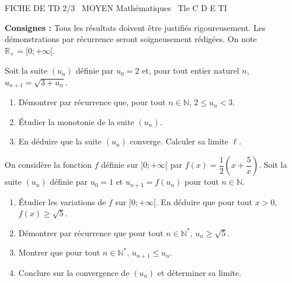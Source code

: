 \documentclass[11pt]{article}
\begin{document}
\begin{tcolorbox}[enhanced,colback=popink,colframe=popink,arc=10pt,boxrule=0pt,left=12pt,right=12pt,top=9pt,bottom=9pt]
{\color{white}\popxbold\small FICHE DE TD 2/3 \textbullet\ MOYEN \hfill Mathématiques \textbullet\ Tle C D E TI\par}
\end{tcolorbox}
\vspace{4pt}
\noindent\textbf{Consignes :} Tous les résultats doivent être justifiés rigoureusement. Les démonstrations par récurrence seront soigneusement rédigées. On note $\mathbb{R}_+ = [0; +\infty[$.

\begin{exercice}
Soit la suite $(u_n)$ définie par $u_0 = 2$ et, pour tout entier naturel $n$, $u_{n+1} = \sqrt{3 + u_n}$.
\begin{enumerate}
    \item Démontrer par récurrence que, pour tout $n \in \mathbb{N}$, $2 \leqslant u_n < 3$.
    \item Étudier la monotonie de la suite $(u_n)$.
    \item En déduire que la suite $(u_n)$ converge. Calculer sa limite $\ell$.
\end{enumerate}
\end{exercice}

\begin{exercice}[Suite définie par $u_{n+1} = f(u_n)$ : étude complète]
On considère la fonction $f$ définie sur $]0; +\infty[$ par $f(x) = \dfrac{1}{2}\left(x + \dfrac{5}{x}\right)$.
Soit la suite $(u_n)$ définie par $u_0 = 1$ et $u_{n+1} = f(u_n)$ pour tout $n \in \mathbb{N}$.
\begin{enumerate}
    \item Étudier les variations de $f$ sur $]0; +\infty[$. En déduire que pour tout $x > 0$, $f(x) \geqslant \sqrt{5}$.
    \item Démontrer par récurrence que pour tout $n \in \mathbb{N}^*$, $u_n \geqslant \sqrt{5}$.
    \item Montrer que pour tout $n \in \mathbb{N}^*$, $u_{n+1} \leqslant u_n$.
    \item Conclure sur la convergence de $(u_n)$ et déterminer sa limite.
\end{enumerate}
\end{exercice}
\end{document}
